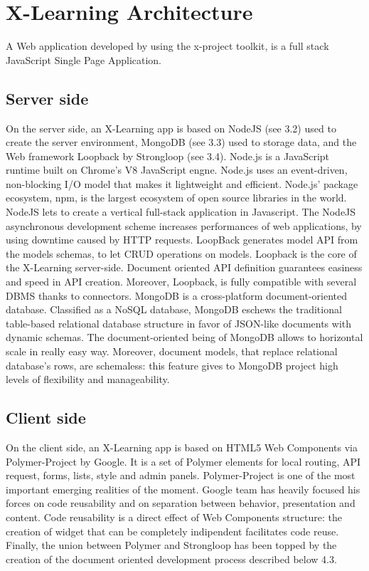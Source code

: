 \section{X-Learning  Architecture}
\label{sec:x-learning_architecture}

A Web application developed by using the x-project toolkit, is a full stack JavaScript Single Page Application.


\subsection{Server side}
\label{subsec:server_side}

On the server side, an X-Learning app is based on NodeJS (see 3.2) used to create the server environment, MongoDB (see 3.3) used to storage data, and the Web framework Loopback by Strongloop (see 3.4).
Node.js is a JavaScript runtime built on Chrome’s  V8  JavaScript  engne. Node.js uses an event-driven, non-blocking I/O model that makes it lightweight and efficient. Node.js’ package ecosystem, npm, is the largest ecosystem of open source libraries in the world. NodeJS lets to create a vertical full-stack application in Javascript. The NodeJS asynchronous development scheme increases performances of web applications, by using downtime caused  by  HTTP requests.
LoopBack generates model API from the models schemas, to let CRUD operations on models. Loopback is the core of the X-Learning server-side. Document oriented API definition guarantees easiness and speed in API creation. Moreover, Loopback, is fully compatible with several DBMS thanks to connectors.
MongoDB is a cross-platform document-oriented database.  Classified as a NoSQL database, MongoDB eschews the traditional table-based relational database structure in favor of JSON-like documents with dynamic schemas. The document-oriented being of MongoDB allows to horizontal scale in really easy way. Moreover, document models, that replace relational database’s rows, are schemaless: this feature gives to MongoDB project high levels of flexibility and manageability.

\subsection{Client side}
\label{subsec:client_side}

On the client side, an X-Learning app is based on HTML5 Web Components via Polymer-Project by Google. It is a set of Polymer elements for local routing, API request, forms, lists, style and admin panels.
Polymer-Project is one of the most important emerging realities of the moment. Google team has heavily focused his forces on code reusability and on separation between behavior, presentation and content.  Code reusability is a direct effect of Web Components structure: the creation of widget that can be completely indipendent facilitates code reuse.
Finally, the union between Polymer and Strongloop has been topped by the creation of the document oriented development process described below 4.3.


